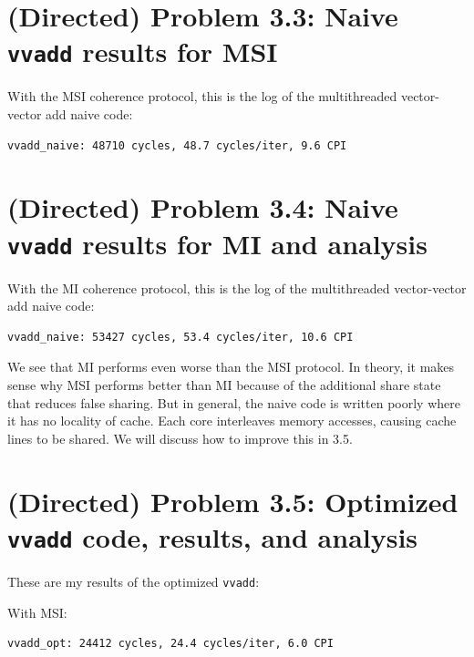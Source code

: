 \documentclass[11pt]{article}
\begin{document}
\section*{(Directed) Problem 3.3: Naive \texttt{vvadd} results for MSI}
With the MSI coherence protocol, this is the log of the multithreaded vector-vector add naive code:
\begin{verbatim}
vvadd_naive: 48710 cycles, 48.7 cycles/iter, 9.6 CPI
\end{verbatim}

\section*{(Directed) Problem 3.4: Naive \texttt{vvadd} results for MI and analysis}
With the MI coherence protocol, this is the log of the multithreaded vector-vector add naive code:
\begin{verbatim}
vvadd_naive: 53427 cycles, 53.4 cycles/iter, 10.6 CPI
\end{verbatim}

We see that MI performs even worse than the MSI protocol. In theory, it makes sense why MSI performs better than MI because of the additional share state that reduces false sharing. But in general, the naive code is written poorly where it has no locality of cache. Each core interleaves memory accesses, causing cache lines to be shared. We will discuss how to improve this in 3.5.

\section*{(Directed) Problem 3.5: Optimized \texttt{vvadd} code, results, and analysis}
These are my results of the optimized \verb|vvadd|:

With MSI:
\begin{verbatim}
vvadd_opt: 24412 cycles, 24.4 cycles/iter, 6.0 CPI
\end{verbatim}
\end{document}
